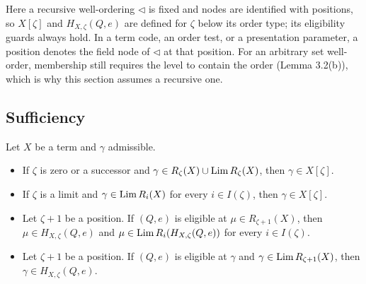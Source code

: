 \documentclass[11pt]{article}
\begin{document}
Here a recursive well-ordering $\lhd$ is fixed and nodes are identified with positions, so $X[\zeta]$ and
$H_{X,\zeta}(Q,e)$ are defined for $\zeta$ below its order type; its eligibility guards always hold. In a term code, an
order test, or a presentation parameter, a position denotes the field node of $\lhd$ at that position. For an
arbitrary set well-order, membership still requires the level to contain the order (Lemma 3.2(b)), which is why this
section assumes a recursive one.

\subsection{Sufficiency}

\begin{statement} Let $X$ be a term and $\gamma$ admissible.
\begin{itemize}
\item[(a)] If $\zeta$ is zero or a successor and $\gamma \in R_\zeta(X) \cup \mathrm{Lim}\, R_\zeta(X)$, then $\gamma \in
  X[\zeta]$.
\item[(b)] If $\zeta$ is a limit and $\gamma \in \mathrm{Lim}\, R_i(X)$ for every $i \in I(\zeta)$, then $\gamma \in X[\zeta]$.
\item[(c)] Let $\zeta+1$ be a position. If $(Q,e)$ is eligible at $\mu \in R_{\zeta+1}(X)$, then $\mu \in
  H_{X,\zeta}(Q,e)$ and $\mu \in \mathrm{Lim}\, R_i(H_{X,\zeta}(Q,e))$ for every $i \in I(\zeta)$.
\item[(d)] Let $\zeta+1$ be a position. If $(Q,e)$ is eligible at $\gamma$ and $\gamma \in \mathrm{Lim}\, R_{\zeta+1}(X)$, then
  $\gamma \in H_{X,\zeta}(Q,e)$.
\end{itemize}
\end{statement}
\end{document}
